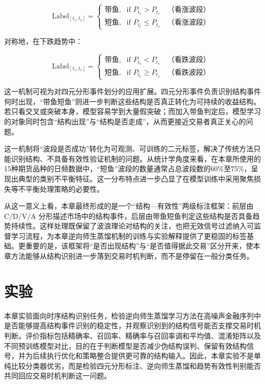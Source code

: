 \begin{equation}
\text{Label}_{[t_s, t_e]} =
\begin{cases}
\text{带鱼}, & \text{if } P_{t_e} > P_{t_s} \quad \text{（看涨波段）} \\
\text{短鱼}, & \text{if } P_{t_e} \leq P_{t_s} \quad \text{（看涨波段）}
\end{cases}
\end{equation}

对称地，在下跌趋势中：

\begin{equation}
\text{Label}_{[t_s, t_e]} =
\begin{cases}
\text{带鱼}, & \text{if } P_{t_e} < P_{t_s} \quad \text{（看跌波段）} \\
\text{短鱼}, & \text{if } P_{t_e} \geq P_{t_s} \quad \text{（看跌波段）}
\end{cases}
\end{equation}

这一机制可视为对四元分形事件划分的应用扩展。四元分形事件负责识别结构事件何时出现，``带鱼短鱼''则进一步判断这些结构是否真正转化为可持续的收益结构。若只看交叉或突破本身，模型容易学到大量假突破；而加入带鱼判定后，模型学习的对象同时包含``结构出现''与``结构是否走成''，从而更接近交易者真正关心的问题。

这一机制将``波段是否成功''转化为可观测、可训练的二元标签，解决了传统方法只能识别结构、不具备有效性验证机制的问题。从统计学角度来看，在本章所使用的15种期货品种的日频数据中，``短鱼''波段的数量通常占总波段数的60\%至75\%，呈现出典型的类别不平衡特征。这一分布特点进一步凸显了在模型训练中采用聚焦损失等不平衡处理策略的必要性。

从这一意义上看，本章最终形成的是一个“结构—有效性”两级标注框架：前层由 C/D/V/A 分形描述市场中的结构事件，后层由带鱼短鱼判定这些结构是否具备趋势持续性。这样处理既保留了波浪理论对结构的关注，也把无效信号过滤纳入可监督学习流程，为本章逆向师生蒸馏机制的训练与实验解释提供了更稳固的标签基础。更重要的是，该框架将``是否出现结构''与``是否值得据此交易''区分开来，使本章方法能够从结构识别进一步落到交易时机判断，而不是停留在一般分类任务。

\section{实验}

本章实验面向时序结构识别任务，检验逆向师生蒸馏学习方法在高噪声金融序列中是否能够提高结构事件识别的稳定性，并观察识别到的结构信号能否支撑交易时机判断。评价指标包括精确率、召回率、精确率与召回率调和平均值、混淆矩阵以及不同预训练模型对比，目的在于判断模型是否减少伪结构误判、保留有效结构信号，并为后续执行优化和策略整合提供更可靠的结构输入。因此，本章实验不是单纯比较分类器优劣，而是检验四元分形标注、逆向师生蒸馏和趋势有效性判别能否共同回应交易时机判断这一问题。

